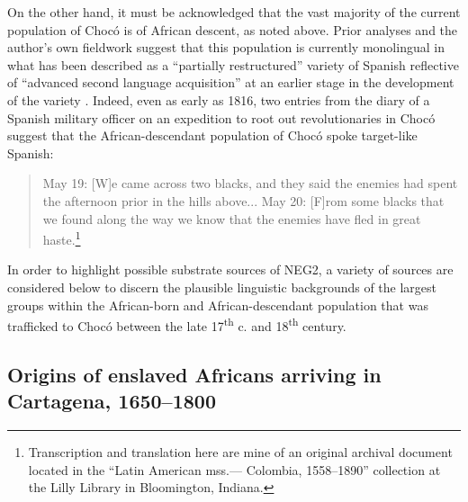 \documentclass[output=paper,colorlinks,citecolor=brown]{langscibook}
\begin{document}
On the other hand, it must be acknowledged that the vast majority of the current population of Chocó is of African descent, as noted above. Prior analyses and the author’s own fieldwork suggest that this population is currently monolingual in what has been described as a “partially restructured” variety of Spanish \citep{RuizGarcia_2001} reflective of “advanced second language acquisition” at an earlier stage in the development of the variety \citep{Sessarego_2016,Sessarego_2019}. Indeed, even as early as 1816, two entries from the diary of a Spanish military officer on an expedition to root out revolutionaries in Chocó suggest that the African-descendant population of Chocó spoke target-like Spanish: 

\begin{quote}
    May 19: [W]e came across two blacks, and they said the enemies had spent the afternoon prior in the hills above... May 20: [F]rom some blacks that we found along the way we know that the enemies have fled in great haste.\footnote{Transcription and translation here are mine of an original archival document located in the “Latin American mss.— Colombia, 1558--1890” collection at the Lilly Library in Bloomington, Indiana.}
\end{quote}

In order to highlight possible substrate sources of NEG2, a variety of sources are considered below  to discern the plausible linguistic backgrounds of the largest groups within the African-born and African-descendant population that was trafficked to Chocó between the late 17\textsuperscript{th} c. and 18\textsuperscript{th} century.

\subsection{Origins of enslaved Africans arriving in Cartagena, 1650--1800}
\end{document}
